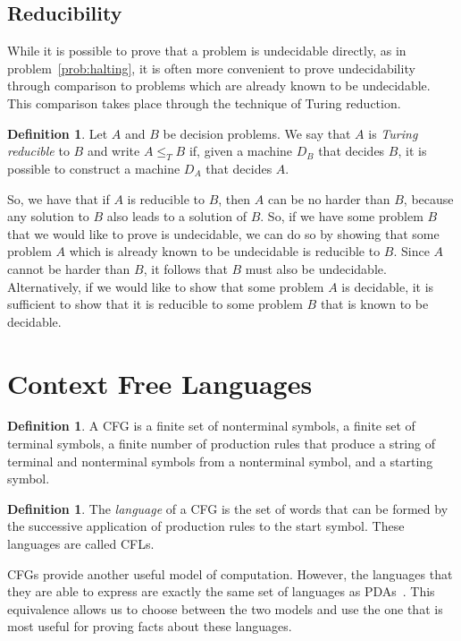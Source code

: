 \documentclass[psamsfonts]{amsart}
\theoremstyle{definition}
\newtheorem{defn}[thm]{Definition}
\theoremstyle{remark}
\numberwithin{equation}{section}
\begin{document}
\subsection{Reducibility}
\label{subsec:reducibility}
While it is possible to prove that a problem is undecidable directly, as in
problem~\ref{prob:halting}, it is often more convenient to prove undecidability
through comparison to problems which are already known to be undecidable. This
comparison takes place through the technique of Turing reduction.
\begin{defn}
  Let $A$ and $B$ be decision problems. We say that $A$ is \emph{Turing reducible}
  to $B$ and write $A \leq_T B$ if, given a machine $D_B$ that decides $B$, it is possible to construct
  a machine $D_A$ that decides $A$.
\end{defn}
So, we have that if $A$ is reducible to $B$, then $A$ can be no harder than $B$,
because any solution to $B$ also leads to a solution of $B$. So, if we have some
problem $B$ that we would like to prove is undecidable, we can do so by showing
that some problem $A$ which is already known to be undecidable is reducible to
$B$. Since $A$ cannot be harder than $B$, it follows that $B$ must also be
undecidable. Alternatively, if we would like to show that some problem $A$ is
decidable, it is sufficient to show that it is reducible to some problem $B$
that is known to be decidable.
\cite{sipser13:_introd_theor_comput}
\cite{post44:_recur}

\cite{kleene80_introd}

\section{Context Free Languages}

\begin{defn}
 A \ac{CFG} is a finite set of nonterminal symbols, a finite set of terminal
 symbols, a finite number of production rules that produce a string of terminal
 and nonterminal symbols from a nonterminal symbol, and a starting symbol.
\end{defn}

\begin{defn}
  The \emph{language} of a \ac{CFG} is the set of words that can be formed by
  the successive application of production rules to the start symbol. These
  languages are called \acp{CFL}.
\end{defn}

\acp{CFG} provide another useful model of computation. However, the languages
that they are able to
express are exactly the same set of languages as \acp{PDA}~\cite{hopcroft07:_introd_autom_theor_languag_comput}. This equivalence allows
us to choose between the two models and use the one that is most useful for
proving facts about these languages.
\end{document}
